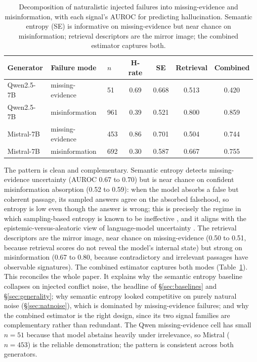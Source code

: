 \documentclass[sn-basic]{sn-jnl}
\theoremstyle{thmstyleone}
\theoremstyle{thmstyletwo}
\begin{document}
\begin{table}[tbp]
\centering\small
\caption{Decomposition of naturalistic injected failures into
missing-evidence and misinformation, with each signal's AUROC for
predicting hallucination. Semantic entropy (SE) is informative on
missing-evidence but near chance on misinformation; retrieval
descriptors are the mirror image; the combined estimator captures both.}
\label{tab:decomp}
\begin{tabular}{lllcccc}
\toprule
Generator & Failure mode & $n$ & H-rate & SE & Retrieval & Combined \\
\midrule
Qwen2.5-7B & missing-evidence & 51  & 0.69 & 0.668 & 0.513 & 0.420 \\
Qwen2.5-7B & misinformation   & 961 & 0.39 & 0.521 & 0.800 & 0.859 \\
Mistral-7B & missing-evidence & 453 & 0.86 & 0.701 & 0.504 & 0.744 \\
Mistral-7B & misinformation   & 692 & 0.30 & 0.587 & 0.667 & 0.755 \\
\bottomrule
\end{tabular}
\end{table}

The pattern is clean and complementary. Semantic entropy detects
missing-evidence uncertainty (AUROC 0.67 to 0.70) but is near chance on
confident misinformation absorption (0.52 to 0.59): when the model
absorbs a false but coherent passage, its sampled answers agree on the
absorbed falsehood, so entropy is low even though the answer is wrong; this
is precisely the regime in which sampling-based entropy is known to be
ineffective \citep{ma2025semanticenergy}, and it aligns with the
epistemic-versus-aleatoric view of language-model uncertainty
\citep{ahdritz2024knowable}.
The retrieval descriptors are the mirror image, near chance on
missing-evidence (0.50 to 0.51, because retrieval scores do not reveal
the model's internal state) but strong on misinformation (0.67 to 0.80,
because contradictory and irrelevant passages have observable
signatures). The combined estimator captures both modes
(Table~\ref{tab:decomp}). This reconciles the whole paper. It explains
why the semantic entropy baseline collapses on injected conflict noise,
the headline of \S\ref{sec:baselines} and \S\ref{sec:generality}; why
semantic entropy looked competitive on purely natural noise
(\S\ref{sec:natnoise}), which is dominated by missing-evidence failures;
and why the combined estimator is the right design, since its two
signal families are complementary rather than redundant. The Qwen
missing-evidence cell has small $n = 51$ because that model abstains
heavily under irrelevance, so Mistral ($n = 453$) is the reliable
demonstration; the pattern is consistent across both generators.
\end{document}
